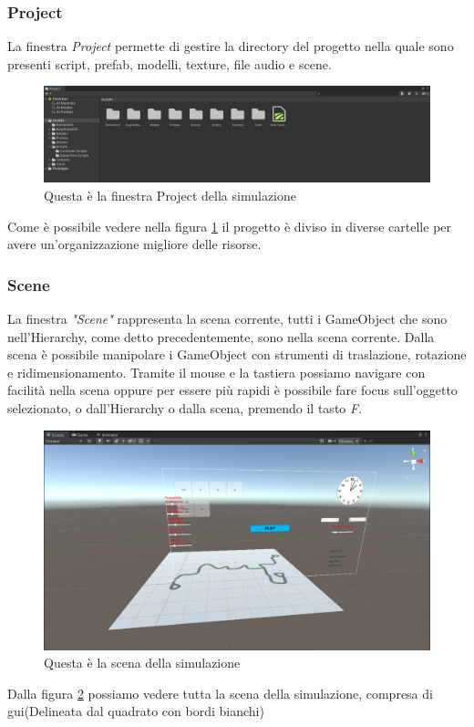 \documentclass[12pt, openany]{book}
\begin{document}
	\subsubsection{Project}
	La finestra \emph{Project} permette di gestire la directory del progetto nella quale sono presenti script, prefab, modelli, texture, file audio e scene.
	\begin{figure}[H]
		\centering
		\includegraphics[width=1\linewidth]{"Immagini/Project"}
		\caption{Questa è la finestra Project della simulazione}
		\label{fig:Project}	
	\end{figure}
	Come è possibile vedere nella figura \ref{fig:Project} il progetto è diviso in diverse cartelle per avere un'organizzazione migliore delle risorse.
	
	\subsubsection{Scene}
		La finestra \emph{"Scene"} rappresenta la scena corrente, tutti i GameObject che sono nell'Hierarchy, come detto precedentemente, sono nella scena corrente. Dalla scena è possibile manipolare i GameObject con strumenti di traslazione, rotazione e ridimensionamento. Tramite il mouse e la tastiera possiamo navigare con facilità nella scena oppure per essere più rapidi è possibile fare focus sull'oggetto selezionato, o dall'Hierarchy o dalla scena, premendo il tasto \emph{F}.
		\begin{figure}[H]
			\centering
			\includegraphics[width=0.72\linewidth]{"Immagini/Scene.png"}
			\caption{Questa è la scena della simulazione}
			\label{fig:Scene}
		\end{figure}
	Dalla figura \ref{fig:Scene} possiamo vedere tutta la scena della simulazione, compresa di gui(Delineata dal quadrato con bordi bianchi)
\end{document}
